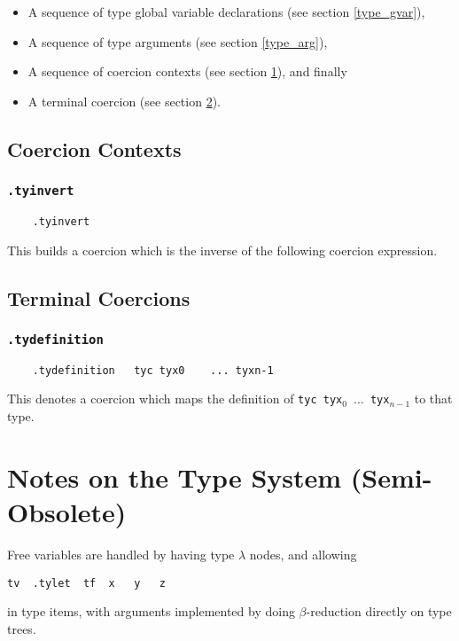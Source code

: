 \documentclass{report}
\newcommand\stringcode[1]{\texttt{#1}}
\begin{document}
\begin{itemize}
    \item A sequence of type global variable declarations (see section \ref{type_gvar}),
    \item A sequence of type arguments (see section \ref{type_arg}),
    \item A sequence of coercion contexts (see section \ref{coercion_context}), and finally
    \item A terminal coercion (see section \ref{coercion_terminal}).
\end{itemize}

\section{Coercion Contexts}
\label{coercion_context}

\subsection{\stringcode{.tyinvert}}

\begin{verbatim}
	.tyinvert
\end{verbatim}
This builds a coercion which is the inverse of the following coercion expression.

\section{Terminal Coercions}
\label{coercion_terminal}

\subsection{\stringcode{.tydefinition}}

\begin{verbatim}
	.tydefinition	tyc	tyx0	...	tyxn-1
\end{verbatim}
This denotes a coercion which maps the definition of \stringcode{tyc tyx$_0$ $\ldots$ tyx$_{n-1}$} to that type.

\chapter{Notes on the Type System (Semi-Obsolete)}

Free variables are handled by having type $\lambda$ nodes, and allowing
\begin{verbatim}
tv	.tylet	tf	x	y	z
\end{verbatim}
in type items, with arguments implemented by doing $\beta$-reduction directly on type trees.
\end{document}
